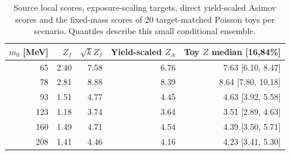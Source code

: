 \begin{table}[H]\centering\small
\begin{tabular}{rrrrr}\toprule
$m_0$ [MeV] & $Z_f$ & $\sqrt{k}Z_f$ & Yield-scaled $Z_A$ & Toy $Z$ median [16,84\%]\\\midrule
65 & 2.40 & 7.58 & 6.76 & 7.63 [6.10, 8.47] \\
78 & 2.81 & 8.88 & 8.39 & 8.64 [7.80, 10.18] \\
93 & 1.51 & 4.77 & 4.45 & 4.63 [3.92, 5.58] \\
123 & 1.18 & 3.74 & 3.64 & 3.51 [2.89, 4.63] \\
160 & 1.49 & 4.71 & 4.54 & 4.39 [3.50, 5.71] \\
208 & 1.41 & 4.46 & 4.16 & 4.23 [3.41, 5.30] \\
\bottomrule\end{tabular}
\caption{Source local scores, exposure-scaling targets, direct yield-scaled
Asimov scores and the fixed-mass scores of 20 target-matched Poisson toys per
scenario. Quantiles describe this small conditional ensemble.}
\label{tab:v505-ten}\end{table}